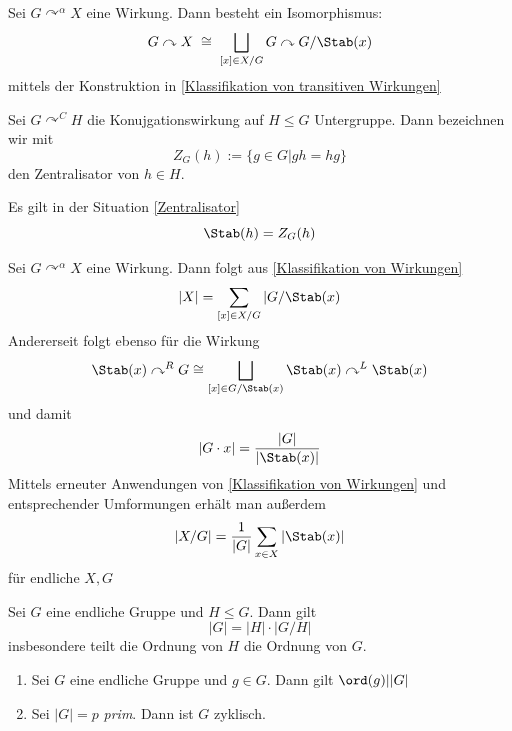 \documentclass[11pt, a4paper]{article}
\begin{document}
\begin{corollary}
Sei $G\curvearrowright^\alpha X$ eine Wirkung. Dann besteht ein Isomorphismus:
$$G\curvearrowright X \; \cong \; \bigsqcup _{[x]\in X/G} G\curvearrowright G/\Stab(x)$$
mittels der Konstruktion in \ref{Klassifikation von transitiven Wirkungen}
    
\end{corollary}

\begin{definition}[Zentralisator] \label{Zentralisator}
    Sei $G\curvearrowright^C H$ die Konujgationswirkung auf $H\leqslant G$ Untergruppe. Dann bezeichnen wir mit 
    $$Z_G(h) := \{g\in G| gh = hg\}$$
    den Zentralisator von $h\in H$.
\end{definition}

\begin{note}
    Es gilt in der Situation  \ref{Zentralisator} 
    $$\Stab(h) = Z_G (h)$$
\end{note}

\begin{lemma}
Sei $G\curvearrowright^\alpha X$ eine Wirkung. Dann folgt aus \ref{Klassifikation von Wirkungen} 
\begin{align}|X| = \sum_{[x]\in X/G} |G/\Stab(x)\end{align}
Andererseit folgt ebenso für die Wirkung $$\Stab(x) \curvearrowright^R G \cong \bigsqcup_{[x]\in G/\Stab(x)} \Stab(x) \curvearrowright^L \Stab(x)$$
und damit \begin{align}|G\cdot x| = \frac{|G|}{|\Stab(x)|}\end{align}
Mittels erneuter Anwendungen von \ref{Klassifikation von Wirkungen} und entsprechender Umformungen erhält man außerdem
\begin{align}|X/G| = \frac 1 {|G|} \sum_{x\in X} |\Stab(x)|\end{align}
für endliche $X, G$
\end{lemma}

\begin{theorem} Sei $G$ eine endliche Gruppe und $H\leqslant G$. Dann gilt 
$$|G| = |H| \cdot |G/H|$$
insbesondere teilt die Ordnung von $H$ die Ordnung von $G$.
    
\end{theorem}

\begin{corollary} \mbox{}
    \begin{enumerate}
        \item Sei $G$ eine endliche Gruppe und $g\in G$. Dann gilt $\ord(g)||G|$
        \item Sei $|G|= p$ \emph{prim}. Dann ist $G$ zyklisch.
    \end{enumerate}
\end{corollary}
\end{document}
